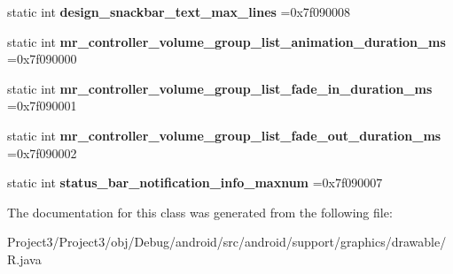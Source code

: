 \begin{DoxyCompactItemize}
static int {\bfseries design\+\_\+snackbar\+\_\+text\+\_\+max\+\_\+lines} =0x7f090008
\item 
\mbox{\label{classandroid_1_1support_1_1graphics_1_1drawable_1_1R_1_1integer_afcae60a7b425aa47fece2d5b1d141d71}} 
static int {\bfseries mr\+\_\+controller\+\_\+volume\+\_\+group\+\_\+list\+\_\+animation\+\_\+duration\+\_\+ms} =0x7f090000
\item 
\mbox{\label{classandroid_1_1support_1_1graphics_1_1drawable_1_1R_1_1integer_aa9515d616cdfc59044035567f0a23eb9}} 
static int {\bfseries mr\+\_\+controller\+\_\+volume\+\_\+group\+\_\+list\+\_\+fade\+\_\+in\+\_\+duration\+\_\+ms} =0x7f090001
\item 
\mbox{\label{classandroid_1_1support_1_1graphics_1_1drawable_1_1R_1_1integer_a9e7c12f8b57b57ac727f364f69291bd7}} 
static int {\bfseries mr\+\_\+controller\+\_\+volume\+\_\+group\+\_\+list\+\_\+fade\+\_\+out\+\_\+duration\+\_\+ms} =0x7f090002
\item 
\mbox{\label{classandroid_1_1support_1_1graphics_1_1drawable_1_1R_1_1integer_a2fa0f1572c37e3ed0e2f7639b6e8f65a}} 
static int {\bfseries status\+\_\+bar\+\_\+notification\+\_\+info\+\_\+maxnum} =0x7f090007
\end{DoxyCompactItemize}


The documentation for this class was generated from the following file\+:\begin{DoxyCompactItemize}
\item 
Project3/\+Project3/obj/\+Debug/android/src/android/support/graphics/drawable/R.\+java\end{DoxyCompactItemize}
